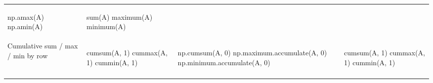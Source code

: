 \documentclass[10pt, landscape]{article}
\newenvironment{Shaded}{}{}
\newcommand{\DecValTok}[1]{\textcolor[rgb]{0.25,0.63,0.44}{{#1}}}
\newcommand{\FloatTok}[1]{\textcolor[rgb]{0.25,0.63,0.44}{{#1}}}
\newcommand{\NormalTok}[1]{{#1}}
\begin{document}
\begin{multicols}{2}
\begin{tabular}[ ]{@{}llll@{}}
\begin{minipage}[t]{0.24\columnwidth}
\begin{Shaded}
\begin{Highlighting}[]
\NormalTok{np.amax(A)}
\NormalTok{np.amin(A)}
\end{Highlighting}
\end{Shaded}
\strut
\end{minipage} & \begin{minipage}[t]{0.20\columnwidth}\raggedright\strut
\begin{Shaded}
\begin{Highlighting}[]
\NormalTok{sum(A)}
\NormalTok{maximum(A)}
\NormalTok{minimum(A)}
\end{Highlighting}
\end{Shaded}
\strut
\end{minipage}\tabularnewline
\begin{minipage}[t]{0.23\columnwidth}\raggedright\strut
Cumulative sum / max / min by row\strut
\end{minipage} & \begin{minipage}[t]{0.22\columnwidth}\raggedright\strut
\begin{Shaded}
\begin{Highlighting}[]
\NormalTok{cumsum(A, }\FloatTok{1}\NormalTok{)}
\NormalTok{cummax(A, }\FloatTok{1}\NormalTok{)}
\NormalTok{cummin(A, }\FloatTok{1}\NormalTok{)}
\end{Highlighting}
\end{Shaded}
\strut
\end{minipage} & \begin{minipage}[t]{0.24\columnwidth}\raggedright\strut
\begin{Shaded}
\begin{Highlighting}[]
\NormalTok{np.cumsum(A, }\DecValTok{0}\NormalTok{)}
\NormalTok{np.maximum.accumulate(A, }\DecValTok{0}\NormalTok{)}
\NormalTok{np.minimum.accumulate(A, }\DecValTok{0}\NormalTok{)}
\end{Highlighting}
\end{Shaded}
\strut
\end{minipage} & \begin{minipage}[t]{0.20\columnwidth}\raggedright\strut
\begin{Shaded}
\begin{Highlighting}[]
\NormalTok{cumsum(A, }\FloatTok{1}\NormalTok{)}
\NormalTok{cummax(A, }\FloatTok{1}\NormalTok{)}
\NormalTok{cummin(A, }\FloatTok{1}\NormalTok{)}
\end{Highlighting}
\end{Shaded}
\strut
\end{minipage}\tabularnewline
\begin{minipage}[t]{0.23\columnwidth}\raggedright\strut

\end{minipage}
\end{tabular}
\end{multicols}
\end{document}
